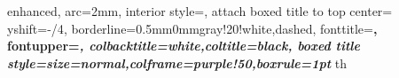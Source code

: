 \newenvironment{redb}[1][0.8]
    {\begin{subfigure}[b]{0.45\textwidth}
   \begin{adjustbox}{width=1\textwidth}
    \begin{circuitikz}[x=0.8cm,y=#1cm]
    \tikzset{font={\fontsize{15pt}{15pt}\selectfont}}
    \ctikzset{bipoles/length=20mm}
    }
    { 
    \end{circuitikz}
    \end{adjustbox} 
     \caption{}
    \end{subfigure} 
    }

%
	{   enhanced,
	arc=2mm,
	interior style={},
	attach boxed title to top center= {yshift=-\tcboxedtitleheight/4},
	borderline={0.5mm}{0mm}{gray!20!white,dashed},
	fonttitle=\bfseries,
	fontupper=\itshape,
	colbacktitle=white,coltitle=black,
	boxed title style={size=normal,colframe=purple!50,boxrule=1pt}
	}
{th}
